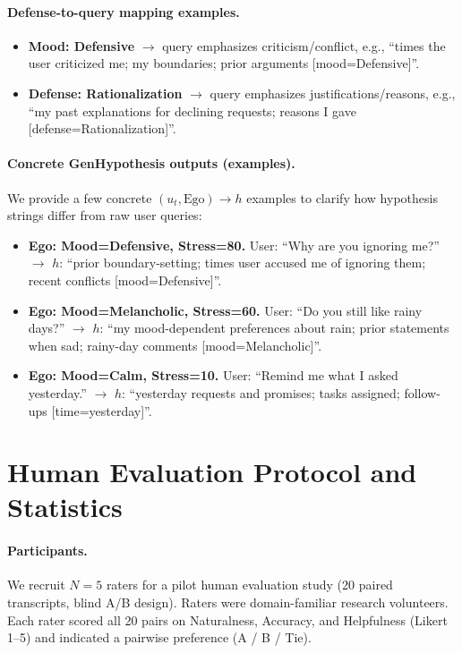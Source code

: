 \documentclass[11pt]{article}
\begin{document}
\paragraph{Defense-to-query mapping examples.}
\begin{itemize}
  \item \textbf{Mood: Defensive} $\rightarrow$ query emphasizes criticism/conflict, e.g., ``times the user criticized me; my boundaries; prior arguments [mood=Defensive]''.
  \item \textbf{Defense: Rationalization} $\rightarrow$ query emphasizes justifications/reasons, e.g., ``my past explanations for declining requests; reasons I gave [defense=Rationalization]''.
\end{itemize}

\paragraph{Concrete GenHypothesis outputs (examples).}
We provide a few concrete $(u_t, \text{Ego})\rightarrow h$ examples to clarify how hypothesis strings differ from raw user queries:
\begin{itemize}
  \item \textbf{Ego: Mood=Defensive, Stress=80.} User: ``Why are you ignoring me?'' $\rightarrow$ $h$: ``prior boundary-setting; times user accused me of ignoring them; recent conflicts [mood=Defensive]''.
  \item \textbf{Ego: Mood=Melancholic, Stress=60.} User: ``Do you still like rainy days?'' $\rightarrow$ $h$: ``my mood-dependent preferences about rain; prior statements when sad; rainy-day comments [mood=Melancholic]''.
  \item \textbf{Ego: Mood=Calm, Stress=10.} User: ``Remind me what I asked yesterday.'' $\rightarrow$ $h$: ``yesterday requests and promises; tasks assigned; follow-ups [time=yesterday]''.
\end{itemize}

\section{Human Evaluation Protocol and Statistics}
\label{app:human-eval}

\paragraph{Participants.}
We recruit \textbf{$N=5$} raters for a pilot human evaluation study (20 paired transcripts, blind A/B design). Raters were domain-familiar research volunteers. Each rater scored all 20 pairs on Naturalness, Accuracy, and Helpfulness (Likert 1--5) and indicated a pairwise preference (A / B / Tie).
\end{document}

